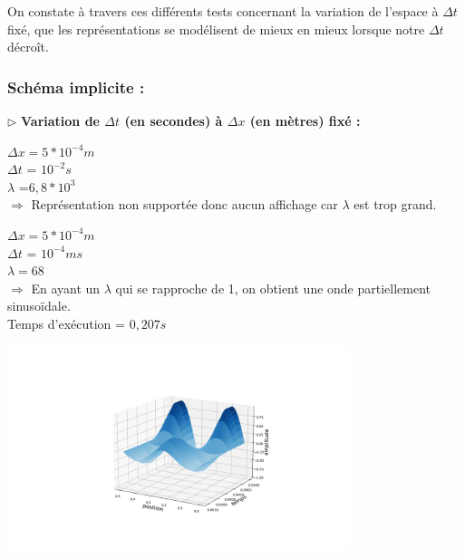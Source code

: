 \begin{enumerate}[label=\alph*)]
\begin{minipage}{.45\textwidth}
\end{minipage}%

On constate à travers ces différents tests concernant la variation de l'espace à $\Delta t$ fixé, que les représentations se modélisent de mieux en mieux lorsque notre $\Delta t$ décroît.


\end{enumerate}


\subsubsection{Schéma implicite :}

$\triangleright$ \textbf{Variation de $\Delta t$ (en secondes) à $\Delta x$ (en mètres) fixé :}\\
\begin{enumerate}[label=\alph*)]


\begin{minipage}{.5\textwidth}%

\item $\Delta x =  5*{10}^{-4}m$\\
$\Delta t$ = ${10}^{-2} s $\\
$\lambda$ =$6,8*{10}^{3}$\\

$\Longrightarrow$ Représentation non supportée donc aucun affichage car $\lambda$ est trop grand.\\ 

\end{minipage}%




\begin{minipage}{.5\textwidth}%
\item $\Delta x = 5*{10}^{-4}m $\\
$\Delta t$ = ${10}^{-4}m s $ \\
$\lambda =68$ \\

$\Longrightarrow$ En ayant un $\lambda$ qui se rapproche de 1, on obtient une onde partiellement sinusoïdale.\\
Temps d'exécution = $0,207s$

\end{minipage}%
\hfill
\begin{minipage}{.45\textwidth}%
\includegraphics[width=10cm,height=6cm]{implicitec.png}
\end{minipage}%


\end{enumerate}
